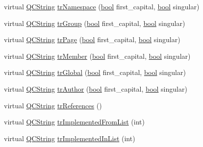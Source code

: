 \begin{DoxyCompactItemize}
\item 
virtual \hyperlink{class_q_c_string}{Q\+C\+String} \hyperlink{class_translator_serbian_a3f2c6a5a298660730c41a48913e0a74e}{tr\+Namespace} (\hyperlink{qglobal_8h_a1062901a7428fdd9c7f180f5e01ea056}{bool} first\+\_\+capital, \hyperlink{qglobal_8h_a1062901a7428fdd9c7f180f5e01ea056}{bool} singular)
\item 
virtual \hyperlink{class_q_c_string}{Q\+C\+String} \hyperlink{class_translator_serbian_a5266e88a507920e98812038495b6c8c9}{tr\+Group} (\hyperlink{qglobal_8h_a1062901a7428fdd9c7f180f5e01ea056}{bool} first\+\_\+capital, \hyperlink{qglobal_8h_a1062901a7428fdd9c7f180f5e01ea056}{bool} singular)
\item 
virtual \hyperlink{class_q_c_string}{Q\+C\+String} \hyperlink{class_translator_serbian_ac8d6bf1f73f589304b5ef733bccf12a2}{tr\+Page} (\hyperlink{qglobal_8h_a1062901a7428fdd9c7f180f5e01ea056}{bool} first\+\_\+capital, \hyperlink{qglobal_8h_a1062901a7428fdd9c7f180f5e01ea056}{bool} singular)
\item 
virtual \hyperlink{class_q_c_string}{Q\+C\+String} \hyperlink{class_translator_serbian_ad713ea1da4fa403235c44e1510c91ee4}{tr\+Member} (\hyperlink{qglobal_8h_a1062901a7428fdd9c7f180f5e01ea056}{bool} first\+\_\+capital, \hyperlink{qglobal_8h_a1062901a7428fdd9c7f180f5e01ea056}{bool} singular)
\item 
virtual \hyperlink{class_q_c_string}{Q\+C\+String} \hyperlink{class_translator_serbian_aef389e4a14e333ec9702960d4e8d9dd0}{tr\+Global} (\hyperlink{qglobal_8h_a1062901a7428fdd9c7f180f5e01ea056}{bool} first\+\_\+capital, \hyperlink{qglobal_8h_a1062901a7428fdd9c7f180f5e01ea056}{bool} singular)
\item 
virtual \hyperlink{class_q_c_string}{Q\+C\+String} \hyperlink{class_translator_serbian_a689feaebb833ec2ce0229e6b68cd3937}{tr\+Author} (\hyperlink{qglobal_8h_a1062901a7428fdd9c7f180f5e01ea056}{bool} first\+\_\+capital, \hyperlink{qglobal_8h_a1062901a7428fdd9c7f180f5e01ea056}{bool} singular)
\item 
virtual \hyperlink{class_q_c_string}{Q\+C\+String} \hyperlink{class_translator_serbian_a4fb8316e8cc5b607aa53c167807d8790}{tr\+References} ()
\item 
virtual \hyperlink{class_q_c_string}{Q\+C\+String} \hyperlink{class_translator_serbian_a22a952ce8035c1e99dd2e5b03191e43c}{tr\+Implemented\+From\+List} (int)
\item 
virtual \hyperlink{class_q_c_string}{Q\+C\+String} \hyperlink{class_translator_serbian_a77b2ac1eb4a418d192e0a1ed04fb8f63}{tr\+Implemented\+In\+List} (int)

\end{DoxyCompactItemize}
